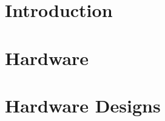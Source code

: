\section{Introduction}
\label{hardware:Introduction}


\section{Hardware}
\label{hardware:hardware}


\section{Hardware Designs}
\label{hardware:designs}
